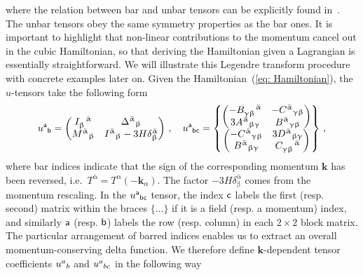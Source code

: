 \documentclass[11pt]{article}
\numberwithin{equation}{section} %
\def \k {\bm{k}}
\begin{document}
where the relation between bar and unbar tensors can be explicitly found in~\cite{Pinol:2023oux}. The unbar tensors obey the same symmetry properties as the bar ones. It is important to highlight that non-linear contributions to the momentum cancel out in the cubic Hamiltonian, so that deriving the Hamiltonian given a Lagrangian is essentially straightforward. We will illustrate this Legendre transform procedure with concrete examples later on. Given the Hamiltonian~(\ref{eq: Hamiltonian}), the $u$-tensors take the following form
\begin{equation}
    \tensor{u}{^{\sf{a}}}{_{\sf{b}}} = 
    \begin{pmatrix}
    \tensor{I}{_{\upbeta}}{^{\bar{\upalpha}}} & \tensor{\Delta}{^{\bar{\upalpha}}}{_\upbeta} \\
    \tensor{M}{^{\bar{\upalpha}}}{_\upbeta} & \tensor{I}{^{\bar{\upalpha}}}{_\upbeta} - 3H\delta^{\bar{\upalpha}}_{\upbeta}
    \end{pmatrix}\,, 
    \quad 
    \tensor{u}{^{\sf{a}}}{_{\sf{bc}}}
    =
    \begin{Bmatrix}
    \begin{pmatrix}
    -\tensor{B}{_{\upgamma\upbeta}}{^{\bar{\upalpha}}} & -\tensor{C}{^{\bar{\upalpha}}}{_{\upgamma\upbeta}}\\
    3\tensor{A}{^{\bar{\upalpha}}}{_{\upbeta\upgamma}} & \tensor{B}{^{\bar{\upalpha}}}{_{\upgamma\upbeta}}
    \end{pmatrix}\\
    \begin{pmatrix}
    -\tensor{C}{^{\bar{\upalpha}}}{_{\upgamma\upbeta}} & 3\tensor{D}{^{\bar{\upalpha}}}{_{\upbeta\upgamma}}\\
    \tensor{B}{^{\bar{\upalpha}}}{_{\upbeta\upgamma}} & \tensor{C}{_{\upgamma\upbeta}}{^{\bar{\upalpha}}}
    \end{pmatrix}
    \end{Bmatrix}\,,
\end{equation}
where bar indices indicate that the sign of the corresponding momentum $\k$ has been reversed, i.e.~$T^{\bar{\upalpha}} = T^{\upalpha}(-\k_\alpha)$. The factor $- 3H\delta^{\bar{\upalpha}}_{\upbeta}$ comes from the momentum rescaling. In the $\tensor{u}{^{\sf{a}}}{_{\sf{bc}}}$ tensor, the index $\sf{c}$ labels the first (resp. second) matrix within the braces $\{\dots\}$ if it is a field (resp. a momentum) index, and similarly $\sf{a}$ (resp. $\sf{b}$) labels the row (resp. column) in each $2\times2$ block matrix. The particular arrangement of barred indices enables us to extract an overall momentum-conserving delta function. We therefore define $\bm{k}$-dependent tensor coefficients $\tensor{u}{^{a}}{_{b}}$ and $\tensor{u}{^{a}}{_{bc}}$ in the following way
\end{document}
